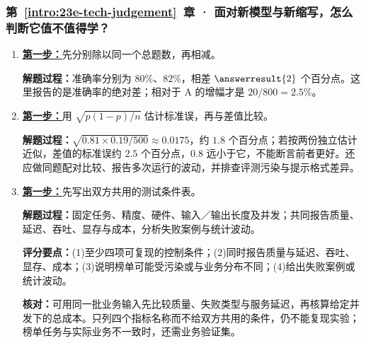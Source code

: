 \subsubsection*{第~\ref*{intro:23e-tech-judgement}~章 · 面对新模型与新缩写，怎么判断它值不值得学？}
\begin{enumerate}[label={},leftmargin=4.8em,itemsep=4pt]
\item[\textbf{C-115.}] \leavevmode{}\label{solution:C-115}\label{solution:metric-percentage-points}\hyperref[exercise:metric-percentage-points]{\textbf{第一步：}}先分别除以同一个总题数，再相减。\par\nobreak
\textbf{解题过程：}准确率分别为 $80\%$、$82\%$，相差 $\answerresult{2}$ 个百分点。这里报告的是准确率的绝对差；相对于 A 的增幅才是 $20/800=2.5\%$。
\item[\textbf{C-116.}] \leavevmode{}\label{solution:C-116}\label{solution:benchmark-count-gap}\hyperref[exercise:benchmark-count-gap]{\textbf{第一步：}}用 $\sqrt{p(1-p)/n}$ 估计标准误，再与差值比较。\par\nobreak
\textbf{解题过程：}$\sqrt{0.81\times0.19/500}\approx0.0175$，约 $1.8$ 个百分点；若按两份独立估计近似，差值的标准误约 $2.5$ 个百分点，$0.8$ 远小于它，不能断言前者更好。还应做同题配对比较、报告多次运行的波动，并排查评测污染与提示格式差异。
\item[\textbf{C-117.}] \leavevmode{}\label{solution:C-117}\label{solution:production-architecture-evaluation}\hyperref[exercise:production-architecture-evaluation]{\textbf{第一步：}}先写出双方共用的测试条件表。\par\nobreak\textbf{解题过程：}固定任务、精度、硬件、输入／输出长度及并发；共同报告质量、延迟、吞吐、显存与成本，分析失败案例与统计波动。\par\textbf{评分要点：}(1)至少四项可复现的控制条件；(2)同时报告质量与延迟、吞吐、显存、成本；(3)说明榜单可能受污染或与业务分布不同；(4)给出失败案例或统计波动。\par\textbf{核对：}可用同一批业务输入先比较质量、失败类型与服务延迟，再核算给定并发下的总成本。只列四个指标名称而不给双方共用的条件，仍不能复现实验；榜单任务与实际业务不一致时，还需业务验证集。
\end{enumerate}
